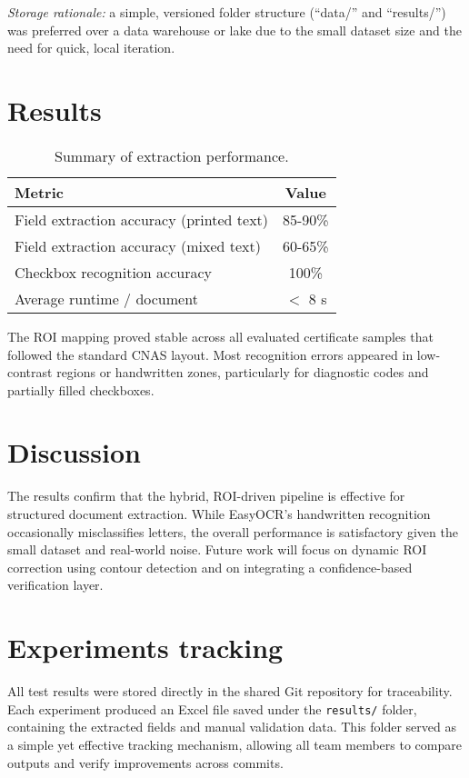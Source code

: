 \documentclass[runningheads,a4paper,11pt]{report}
\begin{document}
\noindent \textit{Storage rationale:} a simple, versioned folder structure (``data/'' and ``results/'') was preferred over a data warehouse or lake due to the small dataset size and the need for quick, local iteration.


\section{Results}
\begin{table}[htbp]
\centering
\caption{Summary of extraction performance.}
\begin{tabular}{l c}
\hline
Metric & Value \\
\hline
Field extraction accuracy (printed text) & 85-90\% \\
Field extraction accuracy (mixed text) & 60-65\% \\
Checkbox recognition accuracy & 100\% \\
Average runtime / document & $<$ 8 s \\
\hline
\end{tabular}
\end{table}

The ROI mapping proved stable across all evaluated certificate samples that followed the standard CNAS layout.  
Most recognition errors appeared in low-contrast regions or handwritten zones, particularly for diagnostic codes and partially filled checkboxes.

\section{Discussion}
The results confirm that the hybrid, ROI-driven pipeline is effective for structured document extraction.  
While EasyOCR's handwritten recognition occasionally misclassifies letters, the overall performance is satisfactory given the small dataset and real-world noise.  
Future work will focus on dynamic ROI correction using contour detection and on integrating a confidence-based verification layer.

\section{Experiments tracking}
All test results were stored directly in the shared Git repository for traceability.  
Each experiment produced an Excel file saved under the \texttt{results/} folder, containing the extracted fields and manual validation data.  
This folder served as a simple yet effective tracking mechanism, allowing all team members to compare outputs and verify improvements across commits.  
\end{document}
